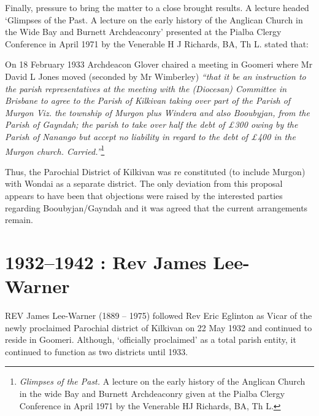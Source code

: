 Finally, pressure to bring the matter to a close brought results. A lecture headed `Glimpses of the Past. A lecture on the early history of the Anglican Church in the Wide Bay and Burnett Archdeaconry' presented at the Pialba Clergy Conference in April 1971 by the Venerable H J Richards, BA, Th L. stated that:



On 18 February 1933 Archdeacon Glover chaired a meeting in Goomeri where Mr David L Jones moved (seconded by Mr Wimberley) \emph{``that it be an instruction to the parish representatives at the meeting with the (Diocesan) Committee in Brisbane to agree to the Parish of Kilkivan taking over part of the Parish of Murgon Viz. the township of Murgon plus Windera and also Booubyjan, from the Parish of Gayndah; the parish to take over half the debt of \pounds300 owing by the Parish of Nanango but accept no liability in regard to the debt of \pounds400 in the Murgon church. Carried.''}\footnote{\emph{Glimpses of the Past.} A lecture on the early history of the Anglican Church in the wide Bay and Burnett Archdeaconry given at the Pialba Clergy Conference in April 1971 by the Venerable HJ Richards, BA, Th L.}


Thus, the Parochial District of Kilkivan was re constituted (to include Murgon) with Wondai as a separate district. The only deviation from this proposal appears to have been that objections were raised by the interested parties regarding Booubyjan/Gayndah and it was agreed that the current arrangements remain.



\balance


\printendnotes[custom]
\setcounter{endnote}{0}
\chapter{1932--1942 : Rev James Lee-Warner}
\nobalance


\lettrine[lines=3]{R}{EV}
 James Lee-Warner (1889 -- 1975) followed Rev Eric Eglinton as Vicar of the newly proclaimed Parochial district of Kilkivan on 22 May 1932 and continued to reside in Goomeri. Although, `officially proclaimed' as a total parish entity, it continued to function as two districts until 1933.

